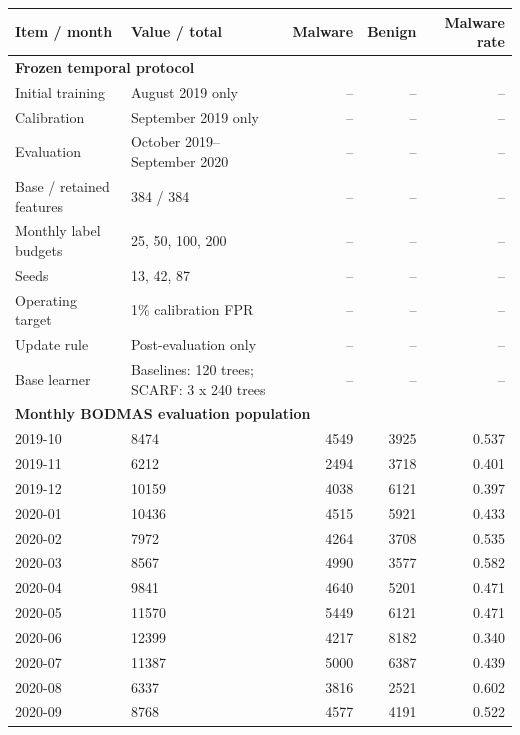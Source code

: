 \setlength{\tabcolsep}{4pt}
\begin{tabular}{llrrr}
\toprule
Item / month & Value / total & Malware & Benign & Malware rate \\
\midrule
\multicolumn{5}{l}{\textbf{Frozen temporal protocol}} \\
Initial training & August 2019 only & -- & -- & -- \\
Calibration & September 2019 only & -- & -- & -- \\
Evaluation & October 2019--September 2020 & -- & -- & -- \\
Base / retained features & 384 / 384 & -- & -- & -- \\
Monthly label budgets & 25, 50, 100, 200 & -- & -- & -- \\
Seeds & 13, 42, 87 & -- & -- & -- \\
Operating target & 1\% calibration FPR & -- & -- & -- \\
Update rule & Post-evaluation only & -- & -- & -- \\
Base learner & Baselines: 120 trees; SCARF: 3 x 240 trees & -- & -- & -- \\
\midrule
\multicolumn{5}{l}{\textbf{Monthly BODMAS evaluation population}} \\
2019-10 & 8474 & 4549 & 3925 & 0.537 \\
2019-11 & 6212 & 2494 & 3718 & 0.401 \\
2019-12 & 10159 & 4038 & 6121 & 0.397 \\
2020-01 & 10436 & 4515 & 5921 & 0.433 \\
2020-02 & 7972 & 4264 & 3708 & 0.535 \\
2020-03 & 8567 & 4990 & 3577 & 0.582 \\
2020-04 & 9841 & 4640 & 5201 & 0.471 \\
2020-05 & 11570 & 5449 & 6121 & 0.471 \\
2020-06 & 12399 & 4217 & 8182 & 0.340 \\
2020-07 & 11387 & 5000 & 6387 & 0.439 \\
2020-08 & 6337 & 3816 & 2521 & 0.602 \\
2020-09 & 8768 & 4577 & 4191 & 0.522 \\
\bottomrule
\end{tabular}
